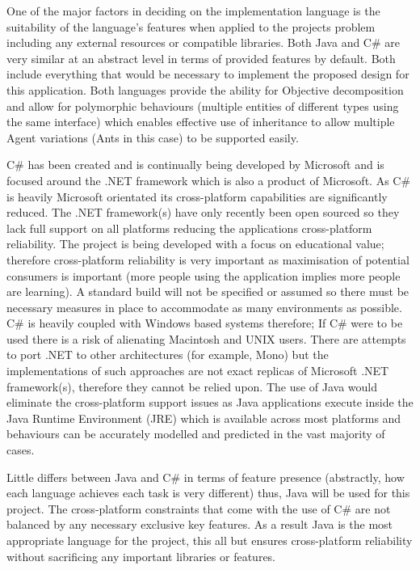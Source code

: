 One of the major factors in deciding on the implementation language is the suitability of the language’s features when applied to the projects problem including any external resources or compatible libraries. Both Java and C\# are very similar at an abstract level in terms of provided features by default. Both include everything that would be necessary to implement the proposed design for this application. Both languages provide the ability for Objective decomposition and allow for polymorphic behaviours (multiple entities of different types using the same interface) which enables effective use of inheritance to allow multiple Agent variations (Ants in this case) to be supported easily. 

C\# has been created and is continually being developed by Microsoft and is focused around the .NET framework which is also a product of Microsoft. As C\# is heavily Microsoft orientated its cross-platform capabilities are significantly reduced. The .NET framework(s) have only recently been open sourced so they lack full support on all platforms reducing the applications cross-platform reliability. The project is being developed with a focus on educational value; therefore cross-platform reliability is very important as maximisation of potential consumers is important (more people using the application implies more people are learning). A standard build will not be specified or assumed so there must be necessary measures in place to accommodate as many environments as possible. C\# is heavily coupled with Windows based systems therefore; If C\# were to be used there is a risk of alienating Macintosh and UNIX users. There are attempts to port .NET to other architectures (for example, Mono\cite{mono}) but the implementations of such approaches are not exact replicas of Microsoft .NET framework(s), therefore they cannot be relied upon. The use of Java would eliminate the cross-platform support issues as Java applications execute inside the Java Runtime Environment (JRE) which is available across most platforms and behaviours can be accurately modelled and predicted in the vast majority of cases.

Little differs between Java and C\# in terms of feature presence (abstractly, how each language achieves each task is very different) thus, Java will be used for this project. The cross-platform constraints that come with the use of C\# are not balanced by any necessary exclusive key features. As a result Java is the most appropriate language for the project, this all but ensures cross-platform reliability without sacrificing any important libraries or features.



